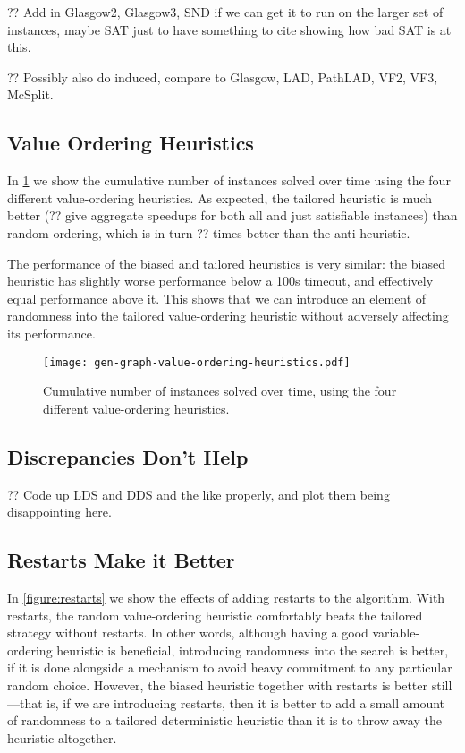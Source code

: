 \documentclass{article}
\begin{document}
?? Add in Glasgow2, Glasgow3, SND if we can get it to run on the larger set of instances,
maybe SAT just to have something to cite showing how bad SAT is at this.

?? Possibly also do induced, compare to Glasgow, LAD, PathLAD, VF2, VF3, McSplit.

\subsection{Value Ordering Heuristics}

In \cref{figure:value-ordering-heuristics} we show the cumulative number of instances solved over
time using the four different value-ordering heuristics. As expected, the tailored heuristic is much
better (?? give aggregate speedups for both all and just satisfiable instances) than random
ordering, which is in turn ?? times better than the anti-heuristic.

The performance of the biased and tailored heuristics is very similar: the biased heuristic has
slightly worse performance below a 100s timeout, and effectively equal performance above it. This
shows that we can introduce an element of randomness into the tailored value-ordering heuristic
without adversely affecting its performance.

\begin{figure}[tb]
    \centering
    \texttt{[image: gen-graph-value-ordering-heuristics.pdf]}

    \caption{Cumulative number of instances solved over time, using the four different
    value-ordering heuristics.}
    \label{figure:value-ordering-heuristics}
\end{figure}

\subsection{Discrepancies Don't Help}

?? Code up LDS and DDS and the like properly, and plot them being disappointing here.

\subsection{Restarts Make it Better}

In \cref{figure:restarts} we show the effects of adding restarts to the algorithm. With restarts,
the random value-ordering heuristic comfortably beats the tailored strategy without restarts. In
other words, although having a good variable-ordering heuristic is beneficial, introducing
randomness into the search is better, if it is done alongside a mechanism to avoid heavy commitment
to any particular random choice.  However, the biased heuristic together with restarts is better
still---that is, if we are introducing restarts, then it is better to add a small amount of
randomness to a tailored deterministic heuristic than it is to throw away the heuristic altogether.
\end{document}
